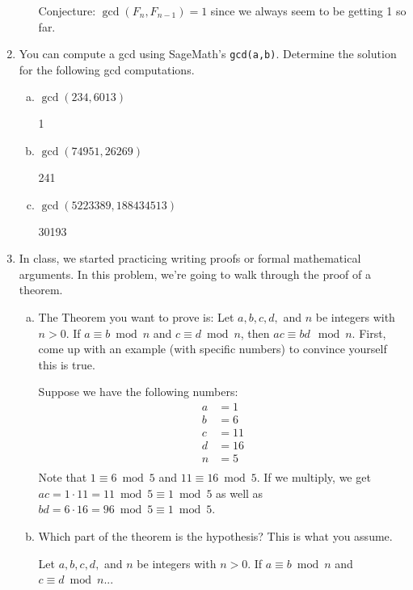\documentclass[12pt]{amsart}
\theoremstyle{plain}
\theoremstyle{definition}
\begin{document}
\begin{enumerate}[1.]
\begin{enumerate}[a.]
\begin{framed}
				Conjecture: $\gcd(F_n,F_{n-1}) = 1$ since we always seem to be getting 1 so far.
			\end{framed}
		\end{enumerate}
	\item You can compute a gcd using SageMath's \texttt{gcd(a,b)}.  Determine the solution for the following gcd computations.
		\begin{enumerate}[a.]
			\item $\gcd(234,6013)$
			\begin{framed}
			1
			\end{framed}
			\item $\gcd(74951,26269)$
			\begin{framed}
			241
			\end{framed}
			\item $\gcd(5223389,188434513)$
			\begin{framed}
			30193
			\end{framed}
		\end{enumerate}
	\item In class, we started practicing writing proofs or formal mathematical arguments.  In this problem, we're going to walk through the proof of a theorem.
	\begin{enumerate}[a.]
		\item The Theorem you want to prove is: Let $a,b,c,d,$ and $n$ be integers with $n > 0$.  If $a \equiv b \bmod n$ and $c \equiv d \bmod n$, then $ac \equiv bd \mod n$.  First, come up with an example (with specific numbers) to convince yourself this is true.
		\begin{framed}
		Suppose we have the following numbers:
		\begin{align*}
		a &= 1\\
		b &= 6\\
		c &= 11\\
		d &= 16\\
		n &= 5\\
		\end{align*}
		Note that $1 \equiv 6 \bmod 5$ and $11 \equiv 16 \bmod 5$.  If we multiply, we get $ac = 1\cdot 11 = 11 \bmod 5 \equiv 1 \bmod 5$ as well as $bd = 6\cdot 16 = 96 \bmod 5 \equiv 1 \bmod 5$.
		\end{framed}
		\item Which part of the theorem is the hypothesis?  This is what you assume.
		\begin{framed}
		Let $a,b,c,d,$ and $n$ be integers with $n > 0$.  If $a \equiv b \bmod n$ and $c \equiv d \bmod n$...

\end{framed}
\end{enumerate}
\end{enumerate}
\end{document}
